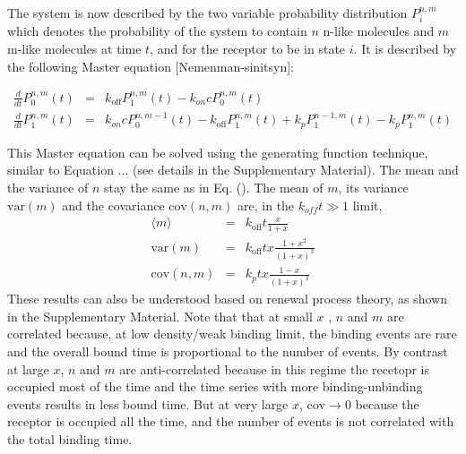 \documentclass[prl,showpacs]{revtex4}
\begin{document}
The system is now described by the two variable probability distribution $P_i^{n,m}$  which denotes the probability of the system to contain $n$ n-like molecules and $m$ m-like molecules at time $t$, and for the receptor to be in state $i$. It is described by the following Master equation [Nemenman-sinitsyn]:

\begin{eqnarray}
\frac{d}{dt}P_0^{n,m}(t)&=&k_{\text{off}}P_1^{n,m}(t)-k_{on}c P_0^{n,m}(t)\\
\frac{d}{dt}P_1^{n,m}(t)&=&k_{on}cP_0^{n,m-1}(t)-k_{\text{off}} P_1^{n,m}(t)+k_pP_1^{n-1,m}(t)- k_p P_1^{n,m}(t)
\end{eqnarray}

This Master equation can be solved using the generating function technique, similar to Equation ... (see details in the Supplementary Material). The mean and the variance of $n$ stay the same as in Eq. (). The mean of $m$, its variance $\text{var}(m)$ and the covariance $\text{cov}(n,m)$ are, in the $k_{off}t\gg 1$ limit, 
%
\begin{eqnarray}
\langle m\rangle&=&k_{\text{off}}t\frac{x}{1+x}\\
\text{var}(m)&=& k_{\text{off}}tx\frac{1+x^2}{(1+x)^3}\nonumber\\
\text{cov}(n,m)&=&k_pt x\frac{1-x}{(1+x)^3}\nonumber
\end{eqnarray}
%
These results can also  be understood based on renewal process theory, as shown in the Supplementary Material. Note that that at small $x$ , $n$ and $m$ are correlated because, at low density/weak binding limit, the binding events are rare and the overall bound time is proportional to the number of events. By contrast at large $x$, $n$ and $m$ are anti-correlated because in this regime the recetopr is occupied most of the time and the time series with more binding-unbinding events results in less bound time. But at very large $x$, $\text{cov}\rightarrow 0$ because the receptor is occupied all the time, and the number of events is not correlated with the total binding time.
\end{document}
